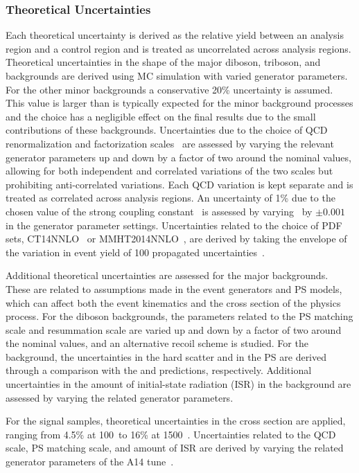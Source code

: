 \subsubsection{Theoretical Uncertainties }
\label{sec:stats:systs:theory}
Each theoretical uncertainty is derived as the relative yield between an analysis region and a control region and is treated as uncorrelated across analysis regions.
Theoretical uncertainties in the shape of the major diboson, triboson, and \ttZ backgrounds are derived using MC simulation with varied generator parameters.
For the other minor backgrounds a conservative 20\% uncertainty is assumed.
This value is larger than is typically expected for the minor background processes and the choice has a negligible effect on the final results due to the small contributions of these backgrounds.
Uncertainties due to the choice of QCD renormalization and factorization scales~\cite{Bothmann:2016nao} are assessed by varying the relevant generator parameters up and down by a factor of two around the nominal values, allowing for both independent and correlated variations of the two scales but prohibiting anti-correlated variations.
Each QCD variation is kept separate and is treated as correlated across analysis regions.
An uncertainty of 1\% due to the chosen value of the strong coupling constant \alphas\ is assessed by varying \alphas\ by $\pm 0.001$ in the generator parameter settings.
Uncertainties related to the choice of PDF sets, CT14NNLO~\cite{Dulat:2015mca} or MMHT2014NNLO~\cite{Harland-Lang:2014zoa}, are derived by taking the envelope of the variation in event yield of 100 propagated uncertainties~\cite{Butterworth:2015oua}.

Additional theoretical uncertainties are assessed for the major backgrounds. 
These are related to assumptions made in the event generators and PS models, which can affect both the event kinematics and the cross section of the physics process.
For the diboson backgrounds, the \SHERPA parameters related to the PS matching scale and resummation scale are varied up and down by a factor of two around the nominal values, and an alternative recoil scheme is studied.
For the \ttZ background, the uncertainties in the hard scatter and in the PS are derived through a comparison with the \SHERPA and \amchseven predictions, respectively.
Additional uncertainties in the amount of initial-state radiation (ISR) in the \ttZ background are assessed by varying the related generator parameters.

For the signal samples, theoretical uncertainties in the cross section are applied, ranging from 4.5\% at 100~\GeV to 16\% at 1500~\GeV.
Uncertainties related to the QCD scale, PS matching scale, and amount of ISR are derived by varying the related generator parameters of the A14 tune~\cite{ATL-PHYS-PUB-2014-021}.

